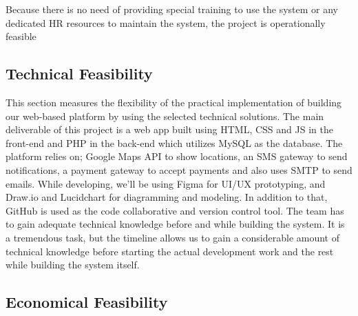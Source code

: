 Because there is no need of providing special training to use the system or any
dedicated HR resources to maintain the system, the project is operationally feasible


\subsection{Technical Feasibility}

This section measures the flexibility of the practical implementation of building our
web-based platform by using the selected technical solutions. The main deliverable of
this project is a web app built using HTML, CSS and JS in the front-end and PHP in the
back-end which utilizes MySQL as the database. 
The platform relies on; Google Maps API to show locations, an SMS gateway to send
notifications, a payment gateway to accept payments and also uses SMTP to send
emails.
While developing, we’ll be using Figma for UI/UX prototyping, and Draw.io and Lucidchart for diagramming and modeling. In addition to that, GitHub is used as the code collaborative and version control tool.
The team has to gain adequate technical knowledge before and while building the system. It is a tremendous task, but the timeline allows us to gain a considerable amount of technical knowledge before starting the actual development work and the rest while
building the system itself.\\

\subsection{Economical Feasibility}

